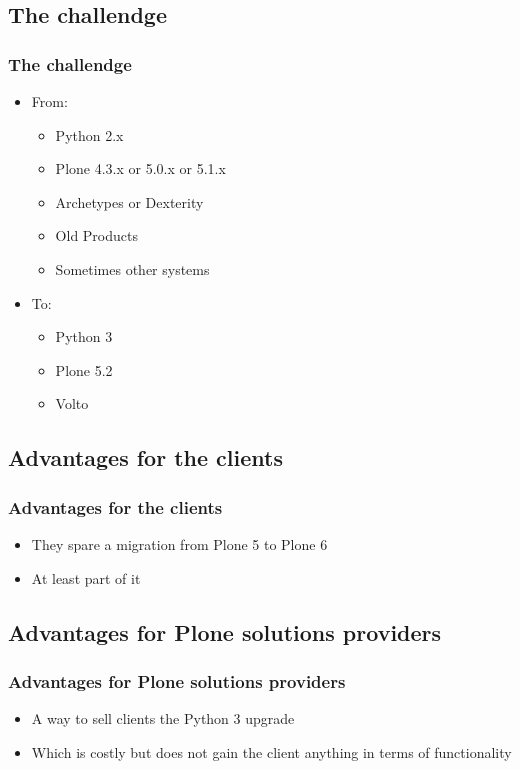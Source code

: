 \documentclass[aspectratio=169]{beamer}
\begin{document}
\subsection{The challendge}
\begin{frame}
  \frametitle{The challendge}
  \begin{itemize}
    \item From:
    \begin{itemize}
      \item Python 2.x \pause
      \item Plone 4.3.x or 5.0.x or 5.1.x \pause
      \item Archetypes or Dexterity \pause
      \item Old Products \pause
      \item Sometimes other systems \pause
    \end{itemize}
    \item To:
    \begin{itemize}
      \item Python 3 \pause
      \item Plone 5.2 \pause
      \item Volto
    \end{itemize}
  \end{itemize}
\end{frame}

\subsection{Advantages for the clients}
\begin{frame}
  \frametitle{Advantages for the clients}
  \begin{itemize}
    \item They spare a migration from Plone 5 to Plone 6 \pause
    \item At least part of it
  \end{itemize}
\end{frame}

\subsection{Advantages for Plone solutions providers}
\begin{frame}
  \frametitle{Advantages for Plone solutions providers}
  \begin{itemize}
    \item A way to sell clients the Python 3 upgrade \pause
    \item Which is costly but does not gain the client anything in terms of functionality
  \end{itemize}
\end{frame}
\end{document}

